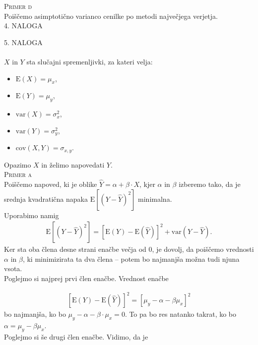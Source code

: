 \documentclass[a4paper,12pt]{article}
\begin{document}
\noindent
\textsc{Primer d}
\\
Poiščemo asimptotično varianco cenilke po metodi največjega verjetja.
\\
 

\noindent
\textsc{\large{4. NALOGA}}


\noindent
\textsc{\large{5. NALOGA}}
\\
\\
$X$ in $Y$ sta slučajni spremenljivki, za kateri velja:
\begin{itemize} 
    \item $\text{E}(X) = \mu_x$,
    \item $\text{E}(Y) = \mu_y$,
    \item $\text{var}(X) = \sigma_x^2$,
    \item $\text{var}(Y) = \sigma_y^2$,
    \item $\text{cov}(X,Y) = \sigma_{x,y}$.
\end{itemize}
Opazimo $X$ in želimo napovedati $Y$. 
\\

\noindent
\textsc{Primer a}
\\
Poiščemo napoved, ki je oblike $\hat{Y} = \alpha + \beta \cdot X$, kjer $\alpha$ in $\beta$ izberemo tako, da je srednja kvadratična napaka $\text{E} \left[ \left( Y - \hat{Y} \right) ^2 \right]$ minimalna.
\\
Uporabimo namig 
\begin{align} 
    \text{E} \left[ \left( Y - \hat{Y} \right) ^2 \right] = \left[ \text{E}(Y) - \text{E}(\hat{Y}) \right]^2 + \text{var}(Y - \hat{Y}).
\end{align}
Ker sta oba člena desne strani enačbe večja od $0$, je dovolj, da poiščemo vrednosti $\alpha$ in $\beta$, ki minimizirata ta dva člena -- potem bo najmanjša možna tudi njuna vsota.
\\
Poglejmo si najprej prvi člen enačbe. Vrednost enačbe

\begin{align*}
    \left[ \text{E}(Y) - \text{E}(\hat{Y}) \right]^2 = \left[ \mu_y - \alpha - \beta \mu_x \right] ^2 
\end{align*}
bo najmanjša, ko bo $ \mu_y - \alpha - \beta \cdot \mu_x = 0$. To pa bo res natanko takrat, ko bo $\alpha = \mu_y - \beta \mu_x$. 
\\
Poglejmo si še drugi člen enačbe. Vidimo, da je 
\end{document}
